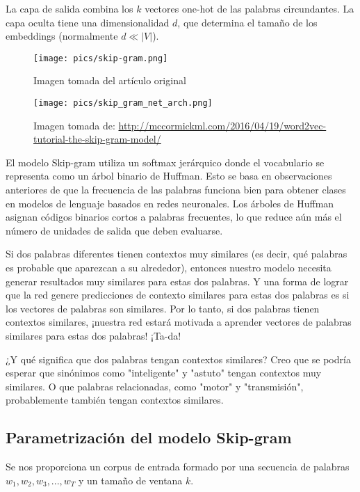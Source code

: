 La capa de salida combina los $k$ vectores one-hot de las palabras circundantes.
La capa oculta tiene una dimensionalidad $d$, que determina el tamaño de los embeddings (normalmente $d \ll |V|$).

\begin{figure}[h]
\centering
\texttt{[image: pics/skip-gram.png]}
\caption{Imagen tomada del artículo original}
\end{figure}

\begin{figure}[h]
\centering
\texttt{[image: pics/skip\_gram\_net\_arch.png]}
\caption{Imagen tomada de: \url{http://mccormickml.com/2016/04/19/word2vec-tutorial-the-skip-gram-model/}}
\end{figure}



El modelo Skip-gram utiliza un softmax jerárquico donde el vocabulario se representa como un árbol binario de Huffman.
Esto se basa en observaciones anteriores de que la frecuencia de las palabras funciona bien para obtener clases en modelos de lenguaje basados en redes neuronales.
Los árboles de Huffman asignan códigos binarios cortos a palabras frecuentes, lo que reduce aún más el número de unidades de salida que deben evaluarse.

Si dos palabras diferentes tienen contextos muy similares (es decir, qué palabras es probable que aparezcan a su alrededor), entonces nuestro modelo necesita generar resultados muy similares para estas dos palabras.
Y una forma de lograr que la red genere predicciones de contexto similares para estas dos palabras es si los vectores de palabras son similares.
Por lo tanto, si dos palabras tienen contextos similares, ¡nuestra red estará motivada a aprender vectores de palabras similares para estas dos palabras! ¡Ta-da!

¿Y qué significa que dos palabras tengan contextos similares? Creo que se podría esperar que sinónimos como "inteligente" y "astuto" tengan contextos muy similares.
O que palabras relacionadas, como "motor" y "transmisión", probablemente también tengan contextos similares.

\subsection{Parametrización del modelo Skip-gram}

Se nos proporciona un corpus de entrada formado por una secuencia de palabras $w_1, w_2, w_3, . . . , w_T$ y un tamaño de ventana $k$.

